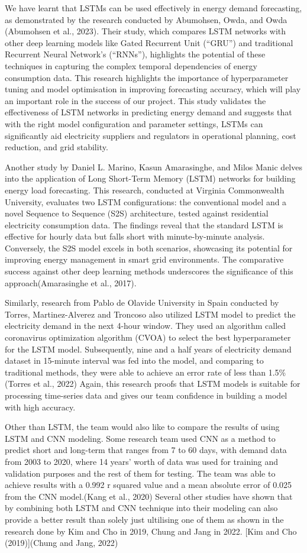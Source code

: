 \documentclass[
]{article}
\begin{document}
We have learnt that LSTMs can be used effectively in energy demand
forecasting, as demonstrated by the research conducted by Abumohsen,
Owda, and Owda (Abumohsen et al., 2023). Their study, which compares
LSTM networks with other deep learning models like Gated Recurrent Unit
(``GRU'') and traditional Recurrent Neural Network's (``RNNs''),
highlights the potential of these techniques in capturing the complex
temporal dependencies of energy consumption data. This research
highlights the importance of hyperparameter tuning and model
optimisation in improving forecasting accuracy, which will play an
important role in the success of our project. This study validates the
effectiveness of LSTM networks in predicting energy demand and suggests
that with the right model configuration and parameter settings, LSTMs
can significantly aid electricity suppliers and regulators in
operational planning, cost reduction, and grid stability.

Another study by Daniel L. Marino, Kasun Amarasinghe, and Milos Manic
delves into the application of Long Short-Term Memory (LSTM) networks
for building energy load forecasting. This research, conducted at
Virginia Commonwealth University, evaluates two LSTM configurations: the
conventional model and a novel Sequence to Sequence (S2S) architecture,
tested against residential electricity consumption data. The findings
reveal that the standard LSTM is effective for hourly data but falls
short with minute-by-minute analysis. Conversely, the S2S model excels
in both scenarios, showcasing its potential for improving energy
management in smart grid environments. The comparative success against
other deep learning methods underscores the significance of this
approach(Amarasinghe et al., 2017).

Similarly, research from Pablo de Olavide University in Spain conducted
by Torres, Martinez-Alverez and Troncoso also utilized LSTM model to
predict the electricity demand in the next 4-hour window. They used an
algorithm called coronavirus optimization algorithm (CVOA) to select the
best hyperparameter for the LSTM model. Subsequently, nine and a half
years of electricity demand dataset in 15-minute interval was fed into
the model, and comparing to traditional methods, they were able to
achieve an error rate of less than 1.5\% (Torres et al., 2022) Again,
this research proofs that LSTM models is suitable for processing
time-series data and gives our team confidence in building a model with
high accuracy.

Other than LSTM, the team would also like to compare the results of
using LSTM and CNN modeling. Some research team used CNN as a method to
predict short and long-term that ranges from 7 to 60 days, with demand
data from 2003 to 2020, where 14 years' worth of data was used for
training and validation purposes and the rest of them for testing. The
team was able to achieve results with a 0.992 r squared value and a mean
absolute error of 0.025 from the CNN model.(Kang et al., 2020) Several
other studies have shown that by combining both LSTM and CNN technique
into their modeling can also provide a better result than solely just
ultilising one of them as shown in the research done by Kim and Cho in
2019, Chung and Jang in 2022. {[}Kim and Cho (2019){]}(Chung and Jang,
2022)
\end{document}
